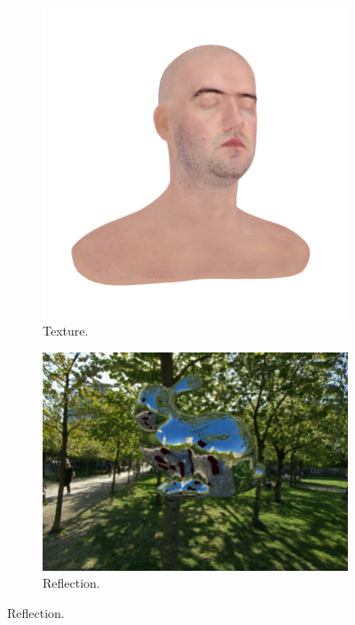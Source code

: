 \documentclass[acmsmall,review,anonymous]{acmart}
\begin{document}
\begin{figure}
	\centering
	\begin{subfigure}[b]{0.45\linewidth}
		\centering
		\includegraphics[width=\linewidth]{fig/texture.png}
		\caption{Texture.}
	\end{subfigure}
	\hfill
	\begin{subfigure}[b]{0.45\linewidth}
		\centering
		\includegraphics[width=\linewidth]{fig/reflection.png}
		\caption{Reflection.}
	\end{subfigure}
	

\end{figure}
\end{document}
